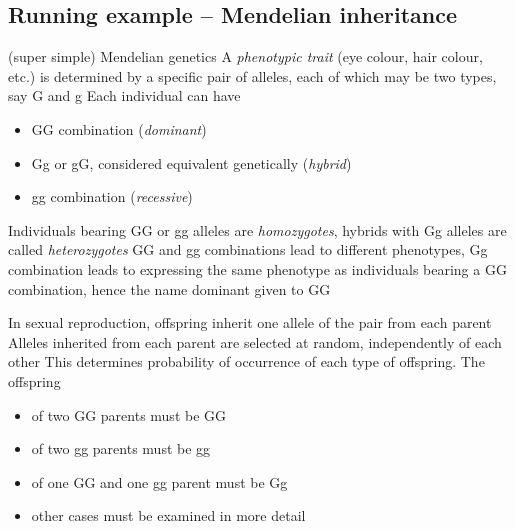 \documentclass[aspectratio=169]{beamer}
\begin{document}
\subsection{Running example -- Mendelian inheritance}
\begin{frame}{(super simple) Mendelian genetics}
A \emph{phenotypic trait} (eye colour, hair colour, etc.) is determined by a specific pair of alleles, each of which may be two types, say G and g
\vfill
Each individual can have
\begin{itemize}
\item GG combination (\emph{dominant})
\item Gg or gG, considered equivalent genetically (\emph{hybrid})
\item gg combination (\emph{recessive})
\end{itemize}
\vfill
Individuals bearing GG or gg alleles are \emph{homozygotes}, hybrids with Gg alleles are called \emph{heterozygotes}
\vfill
GG and gg combinations lead to different phenotypes, Gg combination leads to expressing the same phenotype as individuals bearing a GG combination, hence the name dominant given to GG
\end{frame}

\begin{frame} 
In sexual reproduction, offspring inherit one allele of the pair from each parent
\vfill
Alleles inherited from each parent are selected at random, independently of each other
\vfill
This determines probability of occurrence of each type of offspring. The offspring
\begin{itemize}
\item of two GG parents must be GG
\item of two gg parents must be gg
\item of one GG and one gg parent must be Gg
\item other cases must be examined in more detail
\end{itemize}
\end{frame}
\end{document}
